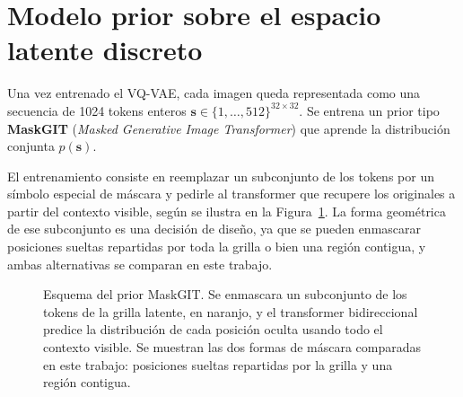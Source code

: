 \section{Modelo prior sobre el espacio latente discreto}

Una vez entrenado el VQ-VAE, cada imagen queda representada como una secuencia de 1024 tokens enteros $\mathbf{s} \in \{1, \ldots, 512\}^{32 \times 32}$. Se entrena un prior tipo \textbf{MaskGIT} (\textit{Masked Generative Image Transformer}) \cite{maskgit2022} que aprende la distribución conjunta $p(\mathbf{s})$.

El entrenamiento consiste en reemplazar un subconjunto de los tokens por un símbolo especial de máscara y pedirle al transformer que recupere los originales a partir del contexto visible, según se ilustra en la Figura~\ref{fig:esquema_maskgit}. La forma geométrica de ese subconjunto es una decisión de diseño, ya que se pueden enmascarar posiciones sueltas repartidas por toda la grilla o bien una región contigua, y ambas alternativas se comparan en este trabajo.

\begin{figure}[H]
\centering
{}
\caption{Esquema del prior MaskGIT. Se enmascara un subconjunto de los tokens de la grilla latente, en naranjo, y el transformer bidireccional predice la distribución de cada posición oculta usando todo el contexto visible. Se muestran las dos formas de máscara comparadas en este trabajo: posiciones sueltas repartidas por la grilla y una región contigua.}
\label{fig:esquema_maskgit}
\end{figure}

